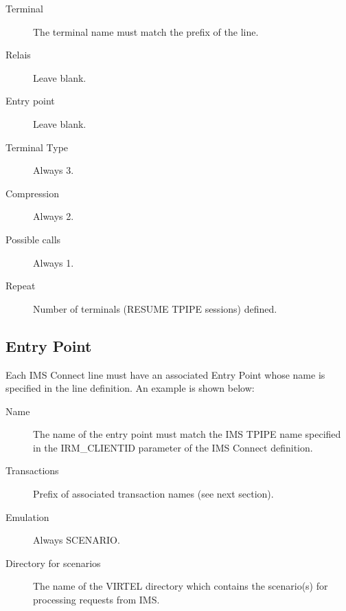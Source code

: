 \documentclass[letterpaper,10pt,english]{sphinxmanual}
\begin{document}
\begin{description}
\item[{Terminal}] \leavevmode
The terminal name must match the prefix of the line.

\item[{Relais}] \leavevmode
Leave blank.

\item[{Entry point}] \leavevmode
Leave blank.

\item[{Terminal Type}] \leavevmode
Always 3.

\item[{Compression}] \leavevmode
Always 2.

\item[{Possible calls}] \leavevmode
Always 1.

\item[{Repeat}] \leavevmode
Number of terminals (RESUME TPIPE sessions) defined.

\end{description}


\subsection{Entry Point}
\label{\detokenize{connectivity_guide:entry-point}}\label{\detokenize{connectivity_guide:index-24}}
Each IMS Connect line must have an associated Entry Point whose name is specified in the line definition. An example is shown below:

\begin{description}
\item[{Name}] \leavevmode
The name of the entry point must match the IMS TPIPE name specified
in the IRM\_CLIENTID parameter of the IMS Connect definition.

\item[{Transactions}] \leavevmode
Prefix of associated transaction names (see next section).

\item[{Emulation}] \leavevmode
Always SCENARIO.

\item[{Directory for scenarios}] \leavevmode
The name of the VIRTEL directory which contains the scenario(s) for
processing requests from IMS.

\end{description}
\end{document}
